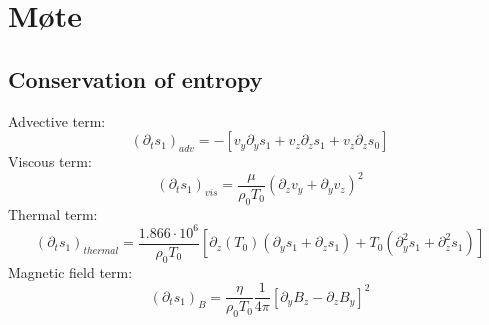 \documentclass{article}
\begin{document}
\section{Møte}

\subsection{Conservation of entropy}
Advective term:\\
\begin{equation}
    (\partial_t s_1)_{adv} = - \left[ v_y \partial_y s_1 + v_z \partial_z s_1 + v_z\partial_z s_0   \right]
\end{equation}
Viscous term:\\
\begin{equation}
    (\partial_t s_1)_{vis} =\frac{\mu}{\rho_0 T_0}(\partial_zv_y+\partial_yv_z)^2
\end{equation}
Thermal term:\\
\begin{equation}
    (\partial_t s_1)_{thermal} = \frac{1.866\cdot 10^6}{\rho_0 T_0}\left[ \partial_z (T_0)(\partial_ys_1+\partial_zs_1)+T_0(\partial_y^2 s_1 + \partial_z^2 s_1)  \right]
\end{equation}
Magnetic field term:\\
\begin{equation}
    (\partial_t s_1)_{B} = \frac{\eta}{\rho_0 T_0}\frac{1}{4\pi}\left[ \partial_y B_z - \partial_z B_y \right]^2
\end{equation}
\end{document}
